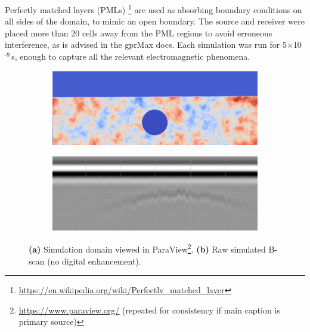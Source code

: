             \noindent Perfectly matched layers (PMLs) \footnote{\url{https://en.wikipedia.org/wiki/Perfectly_matched_layer}} are used as absorbing boundary conditions on all sides of the domain, to mimic an open boundary. The source and receiver were placed more than 20 cells away from the PML regions to avoid erroneous interference, as is advised in the gprMax docs. Each simulation was run for 5$\times$10$^{\text{-9}}$\,s, enough to capture all the relevant electromagnetic phenomena.
            \begin{figure}[htbp]
            \centering
            \begin{subfigure}[b]{0.48\textwidth}
                \centering
                \includegraphics[width=\textwidth]{figs/Rory/radar_domain.pdf}
                \caption{ } 
                \label{fig:radar_domain_sub} 
            \end{subfigure}
            \hfill
            \begin{subfigure}[b]{0.48\textwidth}
                \centering
                \includegraphics[width=\textwidth]{figs/Rory/sim_bscan_cropped.png}
                \caption{ }
                \label{fig:original_bscan_sub}
            \end{subfigure}
            
            \caption[Simulation Domain and Raw B-scan Overview]{%
              \textbf{(a)} Simulation domain viewed in ParaView\footnote{\url{https://www.paraview.org/} (repeated for consistency if main caption is primary source)}.
              \textbf{(b)} Raw simulated B-scan (no digital enhancement).
            }
            \label{fig:domain_and_bscan_overview} %
        \end{figure}   
    
